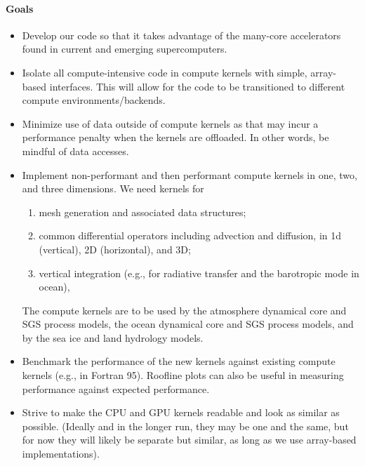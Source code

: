 \documentclass{article}
\begin{document}
\paragraph{Goals}
\begin{itemize}
    \item Develop our code so that it takes advantage of the many-core accelerators found in current and emerging supercomputers.
    \item Isolate all compute-intensive code in compute kernels with simple, array-based interfaces.  This will allow for the code to be transitioned to different compute environments/backends.
    \item Minimize use of data outside of compute kernels as that may incur a performance penalty when the kernels are offloaded.  In other words, be mindful of data accesses.
    \item Implement non-performant and then performant compute kernels in one, two, and three dimensions. We need kernels for 
    \begin{enumerate}
    	\item mesh generation and associated data structures;
	\item common differential operators including advection and diffusion, in 1d (vertical), 2D (horizontal), and 3D;
	\item vertical integration (e.g., for radiative transfer and the barotropic mode in ocean),
    \end{enumerate}
	The compute kernels are to be used by the atmosphere dynamical core and SGS process models, the ocean dynamical core and SGS process models, and by the sea ice and land hydrology models.
    \item Benchmark the performance of the new kernels against existing compute kernels (e.g., in Fortran 95).  Roofline plots can also be useful in measuring performance against expected performance.
    \item Strive to make the CPU and GPU kernels readable and look as similar as possible. (Ideally and in the longer run, they may be one and the same, but for now they will likely be separate but similar, as long as we use array-based implementations). 
\end{itemize}

\end{document}
